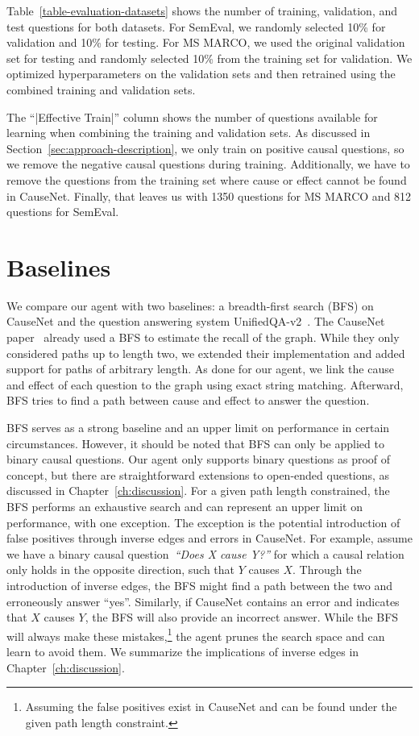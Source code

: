 Table~\ref{table-evaluation-datasets} shows the number of training, validation, and test questions for both
datasets. For SemEval, we randomly selected 10\% for validation and 
10\% for testing. For MS MARCO, we used the original validation set for testing and randomly
selected 10\% from the training set for validation. We optimized hyperparameters 
on the validation sets and then retrained using the combined training and validation sets.

The ``|Effective Train|'' column shows the number of questions available
for learning when combining the training and validation sets. As discussed in 
Section~\ref{sec:approach-description}, we only train on positive causal questions,
so we remove the negative causal questions during training. Additionally, we have to 
remove the questions from the training set where cause or effect cannot 
be found in CauseNet. Finally, that leaves us with 1350 questions for MS MARCO and 812 questions
for SemEval.

\section{Baselines}
\label{sec:baselines}

We compare our agent with two baselines: a breadth-first search (BFS) on CauseNet
 and the question answering system UnifiedQA-v2~\cite{Khashabi2020UnifiedQA, Khashabi2022UnifiedQA2}.
 The CauseNet paper~\cite{Heindorf2020Causenet} already used a BFS to estimate
 the recall of the graph. While they only considered paths up to length two, we 
 extended their implementation and added support for paths of arbitrary length.
 As done for our agent, we link the cause and effect of each question  
 to the graph using exact string matching. Afterward, BFS tries to find a path between cause 
 and effect to answer the question.
 
 BFS serves as a strong baseline and an upper limit on performance in certain circumstances.
 However, it should be noted that BFS can only be applied to binary causal questions. 
 Our agent only supports binary questions as proof of concept, but there are straightforward extensions to open-ended questions, as discussed in Chapter~\ref{ch:discussion}.
 For a given path length constrained, the BFS performs an exhaustive search and can represent an 
 upper limit on performance, with one exception.
 The exception is the potential introduction of false positives through inverse edges and errors in CauseNet.
 For example, assume we have a binary causal question~\textit{``Does X cause Y?''} 
 for which a causal relation only holds in the opposite direction, such that $Y$ causes $X$.
 Through the introduction of inverse edges, the BFS might find a path between the two and erroneously answer ``yes''.
 Similarly, if CauseNet contains an error and indicates that $X$ causes $Y$, the BFS will also provide an incorrect answer.
 While the BFS will always make these mistakes,\footnote{Assuming the false positives exist in CauseNet and can be found under the given path length constraint.} the agent 
 prunes the search space and can learn to avoid them.
 We summarize the implications of inverse edges in Chapter~\ref{ch:discussion}.

